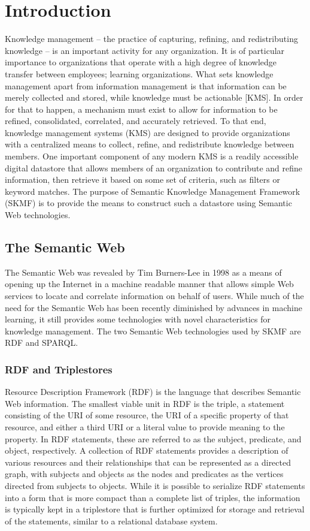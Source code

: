 \chapter{Introduction}

Knowledge management -- the practice of capturing, refining, and redistributing knowledge -- is an important activity for any organization. It is of particular importance to organizations that operate with a high degree of knowledge transfer between employees; learning organizations. What sets knowledge management apart from information management is that information can be merely collected and stored, while knowledge must be actionable [KMS]. In order for that to happen, a mechanism must exist to allow for information to be refined, consolidated, correlated, and accurately retrieved. To that end, knowledge management systems (KMS) are designed to provide organizations with a centralized means to collect, refine, and redistribute knowledge between members. One important component of any modern KMS is a readily accessible digital datastore that allows members of an organization to contribute and refine information, then retrieve it based on some set of criteria, such as filters or keyword matches. The purpose of Semantic Knowledge Management Framework (SKMF) is to provide the means to construct such a datastore using Semantic Web technologies.


\section{The Semantic Web}

The Semantic Web was revealed by Tim Burners-Lee in 1998 as a means of opening up the Internet in a machine readable manner that allows simple Web services to locate and correlate information on behalf of users. While much of the need for the Semantic Web has been recently diminished by advances in machine learning, it still provides some technologies with novel characteristics for knowledge management. The two Semantic Web technologies used by SKMF are RDF and SPARQL.


\subsection{RDF and Triplestores}

Resource Description Framework (RDF) is the language that describes Semantic Web information. The smallest viable unit in RDF is the triple, a statement consisting of the URI of some resource, the URI of a specific property of that resource, and either a third URI or a literal value to provide meaning to the property. In RDF statements, these are referred to as the subject, predicate, and object, respectively. A collection of RDF statements provides a description of various resources and their relationships that can be represented as a directed graph, with subjects and objects as the nodes and predicates as the vertices directed from subjects to objects. While it is possible to serialize RDF statements into a form that is more compact than a complete list of triples, the information is typically kept in a triplestore that is further optimized for storage and retrieval of the statements, similar to a relational database system.

